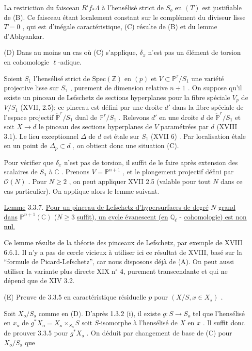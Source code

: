La restriction du faisceau $R^i f_* \Lambda$ à l'hensélisé strict de $S_o$ en $(T)$ est justifiable de (B). Ce faisceau étant localement constant sur le complément du diviseur lisse $T = 0$ , qui est d'inégale caractéristique, (C) résulte de (B) et du lemme d'Abhyankar.

(D) Dans au moins un cas où (C) s'applique, $\delta_x$ n'est pas un élément de torsion en cohomologie $\ell$-adique.



Soient $S_1$ l'hensélisé strict de $\mathrm{Spec}(\mathbb{Z})$ en $(p)$ et $V \subset \mathbb{P}^r/S_1$ une variété projective lisse sur $S_1$ , purement de dimension relative $n+1$ . On suppose qu'il existe un pinceau de Lefschetz de sections hyperplanes pour la fibre spéciale $V_p$ de $V/S_1$ (XVII, 2.5); ce pinceau est défini par une droite $d'$ dans la fibre spéciale de l'espace projectif $\check{\mathbb{P}}^r/S_1$ dual de $\mathbb{P}^r/S_1$ . Relevons $d'$ en une droite $d$ de $\check{\mathbb{P}}^r/S_1$ et soit $X \to d$ le pinceau des sections hyperplanes de $V$ paramétrées par $d$ (XVIII 3.1). Le lieu exceptionnel $\Delta$ de $d$ est étale sur $S_1$ (XVII 6) . Par localisation étale en un point de $\Delta_p \subset d$ , on obtient donc une situation (C).

Pour vérifier que $\delta_x$ n'est pas de torsion, il suffit de le faire après extension des scalaires de $S_1$ à $\mathbb{C}$ . Prenons $V = \mathbb{P}^{n+1}$ , et le plongement projectif défini par $\mathcal{O}(N)$ . Pour $N \geq 2$ , on peut appliquer XVII 2.5 (valable pour tout $N$ dans ce cas particulier). On applique alors le lemme suivant.

\underline{Lemme} 3.3.7. \underline{Pour un pinceau de Lefschetz d'hypersurfaces de degré} $N$ \underline{grand dans} $\mathbb{P}^{n+1}(\mathbb{C})$ ($N \geq 3$ \underline{suffit), un cycle évanescent (en} $\mathbb{Q}_{\ell}$ - \underline{cohomologie) est non nul.}

Ce lemme résulte de la théorie des pinceaux de Lefschetz, par exemple de XVIII 6.6.1. Il n'y a pas de cercle vicieux à utiliser ici ce résultat de XVIII, basé sur la ``formule de Picard-Lefschetz'', car nous disposons déjà de (A). On peut aussi utiliser la variante plus directe XIX n$^{\circ}$ 4, purement transcendante et qui ne dépend que de XIV 3.2.

(E) Preuve de 3.3.5 en caractéristique résiduelle $p$ pour $(X/S, x \in X_s)$ .

Soit $X_o/S_o$ comme en (D). D'après 1.3.2 (i), il existe $g : S \to S_o$ tel que l'hensélisé en $x_o$ de $g^{*}X_o = X_o \times_{S_o} S$ soit $S$-isomorphe à l'hensélisé de $X$ en $x$ . Il suffit donc de prouver 3.3.5 pour $g^{*}X_o$ . On déduit par changement de base de (C) pour $X_o/S_o$ que

